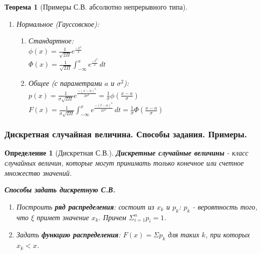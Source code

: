 \documentclass[14pt]{extarticle}
\theoremstyle{breakstyle}
\newtheorem{definition}{Определение}[subsection]
\newtheorem{theorem}{Теорема}[subsection]
\begin{document}
\begin{theorem}[Примеры С.В. абсолютно непрерывного типа]
\begin{enumerate}
    \item Нормальное (Гауссовское):
        \begin{enumerate}
            \item Стандартное: \\
                  $\phi(x) = \frac{1}{\sqrt{2\Pi}} e^{\frac{-x^{2}}{2}}$ \\
                  $\Phi(x) = \frac{1}{\sqrt{2\Pi}} \int_{-\infty}^{x} e^{\frac{-t^{2}}{2}} \, dt$
            \item Общее (с параметрами $a$ и $\sigma^{2}$): \\
                  $p(x) = \frac{1}{\sigma \sqrt{2\Pi}} e^{\frac{-(x - a)^{2}}{2 \sigma^{2}}} = \frac{1}{\sigma} \phi(\frac{x - a}{\sigma})$ \\
                  $F(x) = \frac{1}{\sigma \sqrt{2\Pi}} \int_{-\infty}^{x} e^{\frac{-(t - a)^{2}}{2 \sigma^{2}}} \, dt = \frac{1}{\sigma} \Phi(\frac{x - a}{\sigma})$
        \end{enumerate}
\end{enumerate}

\end{theorem}

\subsubsection{Дискретная случайная величина. Способы задания. Примеры.}
\begin{definition}[Дискретная С.В.]

\textbf{Дискретные случайные величины} - класс случайных величин, которые могут принимать только конечное или счетное множество значений.

\vspace{\baselineskip}

\textbf{Способы задать дискретную С.В.}
\begin{enumerate}
    \item Построить \textbf{ряд распределения}: состоит из $x_{k}$ и $p_{k}$: $p_{k}$ - вероятность того, что $\xi$ примет значение $x_{k}$. Причем $\Sigma_{i=1}^{n}p_{i} = 1$.
    \item Задать \textbf{функцию распределения}: $F(x) = \Sigma p_{k}$ для таких $k$, при которых $x_{k} < x$.
\end{enumerate}

\end{definition}
\end{document}
